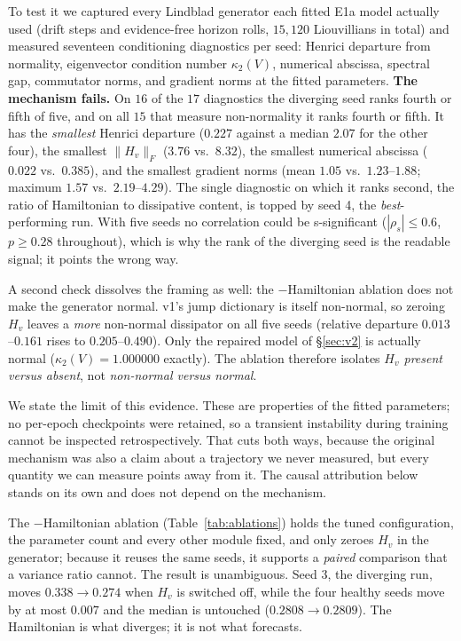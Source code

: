 \documentclass[journal]{IEEEtran}
\begin{document}
To test it we captured every Lindblad generator each fitted E1a model actually used
(drift steps and evidence-free horizon rolls, $15{,}120$ Liouvillians in total)
and measured seventeen conditioning diagnostics per seed: Henrici departure from
normality, eigenvector condition number $\kappa_2(V)$, numerical abscissa, spectral
gap, commutator norms, and gradient norms at the fitted parameters.
\textbf{The mechanism fails.} On $16$ of the $17$ diagnostics the diverging seed
ranks fourth or fifth of five, and on all $15$ that measure non-normality it ranks
fourth or fifth. It has the \emph{smallest} Henrici departure ($0.227$ against a
median $2.07$ for the other four), the smallest $\|H_v\|_F$ ($3.76$ vs.\ $8.32$), the
smallest numerical abscissa ($0.022$ vs.\ $0.385$), and the smallest gradient norms
(mean $1.05$ vs.\ $1.23$--$1.88$; maximum $1.57$ vs.\ $2.19$--$4.29$). The single
diagnostic on which it ranks second, the ratio of Hamiltonian to dissipative
content, is topped by seed 4, the \emph{best}-performing run. With five seeds no
correlation could be s-significant ($|\rho_s| \le 0.6$, $p \ge 0.28$ throughout), which
is why the rank of the diverging seed is the readable signal; it points the wrong way.

A second check dissolves the framing as well: the $-$Hamiltonian ablation does not
make the generator normal. v1's jump dictionary is itself non-normal, so zeroing
$H_v$ leaves a \emph{more} non-normal dissipator on all five seeds (relative
departure $0.013$--$0.161$ rises to $0.205$--$0.490$). Only the repaired model of
\S\ref{sec:v2} is actually normal ($\kappa_2(V) = 1.000000$ exactly). The ablation
therefore isolates \emph{$H_v$ present versus absent}, not \emph{non-normal versus normal}.

We state the limit of this evidence. These are properties of the fitted parameters;
no per-epoch checkpoints were retained, so a transient instability during training
cannot be inspected retrospectively. That cuts both ways, because the original mechanism
was also a claim about a trajectory we never measured, but every quantity we can
measure points away from it. The causal attribution below stands on its own and does
not depend on the mechanism.

The $-$Hamiltonian ablation
(Table~\ref{tab:ablations}) holds the tuned configuration, the parameter count and
every other module fixed, and only zeroes $H_v$ in the generator; because it reuses
the same seeds, it supports a \emph{paired} comparison that a variance ratio cannot.
The result is unambiguous. Seed 3, the diverging run, moves $0.338 \to 0.274$ when
$H_v$ is switched off, while the four healthy seeds move by at most $0.007$ and the
median is untouched ($0.2808 \to 0.2809$). The Hamiltonian is what diverges; it is
not what forecasts.
\end{document}
